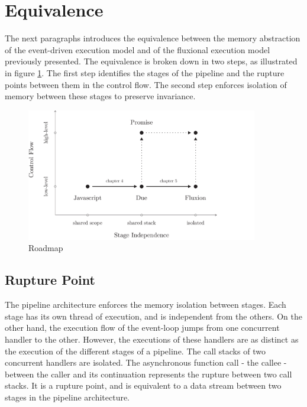 \section{Equivalence} \label{chapter4:equivalence}

The next paragraphs introduces the equivalence between the memory abstraction of the event-driven execution model and of the fluxional execution model previously presented.
The equivalence is broken down in two steps, as illustrated in figure \ref{fig:roadmap}.
The first step identifies the stages of the pipeline and the rupture points between them in the control flow.
The second step enforces isolation of memory between these stages to preserve invariance.

\begin{figure}[h!]
\begin{center}
\includegraphics[width=0.9\textwidth]{../resources/roadmap.pdf}
\end{center}
\caption{Roadmap}
\label{fig:roadmap}
\end{figure}

\subsection{Rupture Point}

The pipeline architecture enforces the memory isolation between stages.
Each stage has its own thread of execution, and is independent from the others.
On the other hand, the execution flow of the event-loop jumps from one concurrent handler to the other.
However, the executions of these handlers are as distinct as the execution of the different stages of a pipeline.
The call stacks of two concurrent handlers are isolated.
The asynchronous function call - the callee - between the caller and its continuation represents the rupture between two call stacks.
It is a rupture point, and is equivalent to a data stream between two stages in the pipeline architecture.

